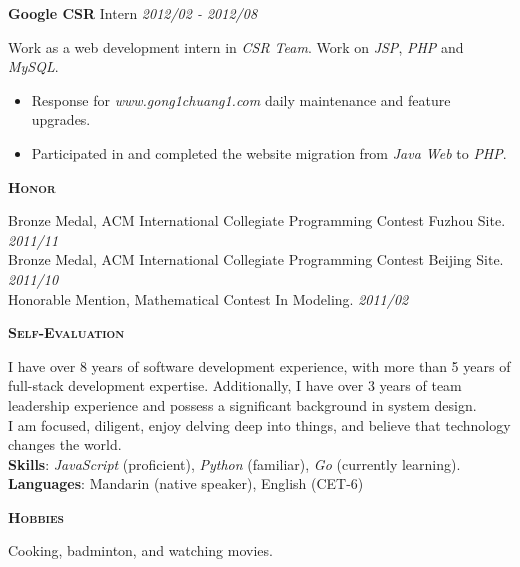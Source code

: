 \documentclass[a4paper]{article}
\newenvironment{changemargin}[2]{%
  \begin{list}{}{%
    \setlength{\topsep}{0pt}%
    \setlength{\leftmargin}{#1}%
    \setlength{\rightmargin}{#2}%
    \setlength{\listparindent}{\parindent}%
    \setlength{\itemindent}{\parindent}%
    \setlength{\parsep}{\parskip}%
  }%
  \item[]}{\end{list}
}
\newcommand{\lineover}{
	\begin{changemargin}{-0.05in}{-0.05in}
		\vspace*{-8pt}
		\hrulefill \\
		\vspace*{-2pt}
	\end{changemargin}
}
\newcommand{\header}[1]{
	\begin{changemargin}{-0.5in}{-0.5in}
		\scshape{\textbf{#1}}\\
	\end{changemargin}
}
\newenvironment{body} {
	\vspace*{-16pt}
	\begin{changemargin}{-0.5in}{-0.5in}
  }
	{\end{changemargin}
}
\begin{document}
\begin{body}
	\textbf{Google CSR} \hfill Intern \emph{2012/02 - 2012/08}\\ 
	\smallskip
	
	Work as a web development intern in \emph{CSR Team}. Work on \emph{JSP}, \emph{PHP} and \emph{MySQL}.
	\vspace*{-4pt}

	\begin{itemize} \itemsep -0pt  %
		\item Response for \emph{www.gong1chuang1.com} daily maintenance and feature upgrades.\\
	\end{itemize}
	\vspace*{-8pt}
	\begin{itemize} \itemsep -0pt  %
		\item Participated in and completed the website migration from \emph{Java Web} to \emph{PHP}.\\
	\end{itemize}

\end{body}

\medskip

\header{Honor}
\begin{body}
	\vspace{14pt}
	Bronze Medal, ACM International Collegiate Programming Contest Fuzhou Site. \hfill \emph{2011/11}\\
	Bronze Medal, ACM International Collegiate Programming Contest Beijing Site. \hfill \emph{2011/10}\\
	Honorable Mention, Mathematical Contest In Modeling. \hfill \emph{2011/02}\\
\end{body}

\medskip


\header{Self-Evaluation}

\begin{body}
	\vspace{14pt}
	I have over 8 years of software development experience, with more than 5 years of full-stack development expertise. Additionally, I have over 3 years of team leadership experience and possess a significant background in system design.\\
	I am focused, diligent, enjoy delving deep into things, and believe that technology changes the world.\\
	\textbf{Skills}: \emph{JavaScript} (proficient), \emph{Python} (familiar), \emph{Go} (currently learning). \\
	\textbf{Languages}: Mandarin {(native speaker)}, English {(CET-6)}\\
\end{body}

\medskip


\header{Hobbies}

\begin{body}
	\vspace{14pt}
	Cooking, badminton, and watching movies.\\
\end{body}
\end{document}
